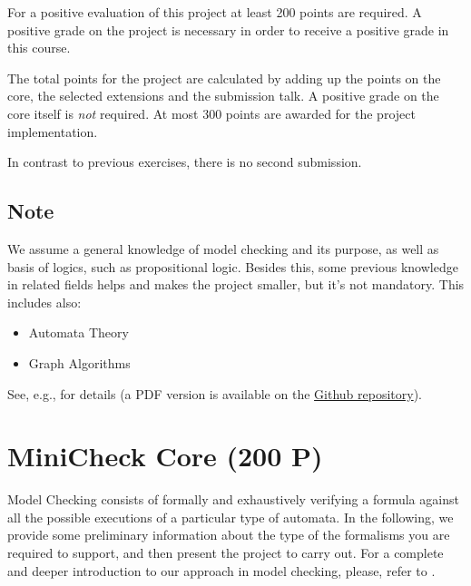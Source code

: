 \documentclass{article}
\begin{document}
For a positive evaluation of this project at least 200 points are required. 
A positive grade on the project is necessary in order to receive a positive grade in this course. 

The total points for the project are calculated by adding up the points on the core, 
the selected extensions and the submission talk. A positive grade on the core itself is \textit{not} required. 
At most 300 points are awarded for the project implementation.

In contrast to previous exercises, there is no second submission.

\subsection{Note}
We assume a general knowledge of model checking and its purpose, as well as basis of logics,
such as propositional logic.  Besides this, some previous knowledge in related fields helps 
and makes the project smaller, but it's not mandatory. This includes also:
\begin{itemize}
    \item Automata Theory
    \item Graph Algorithms
\end{itemize}
See, e.g., \cite{BaKa} for details (a PDF version is available on the 
\href{https://github.com/francescopont/MiniCheck.git}{Github repository}).

\section{MiniCheck Core (200 P)}

Model Checking consists of formally and exhaustively verifying a formula 
against all the possible executions of a particular type of automata. 
In the following, we provide some preliminary information 
about the type of the formalisms you are required to support, 
and then present the project to carry out. 
For a complete and deeper introduction to our approach in model checking, 
please, refer to \cite{BaKa}.
\end{document}
